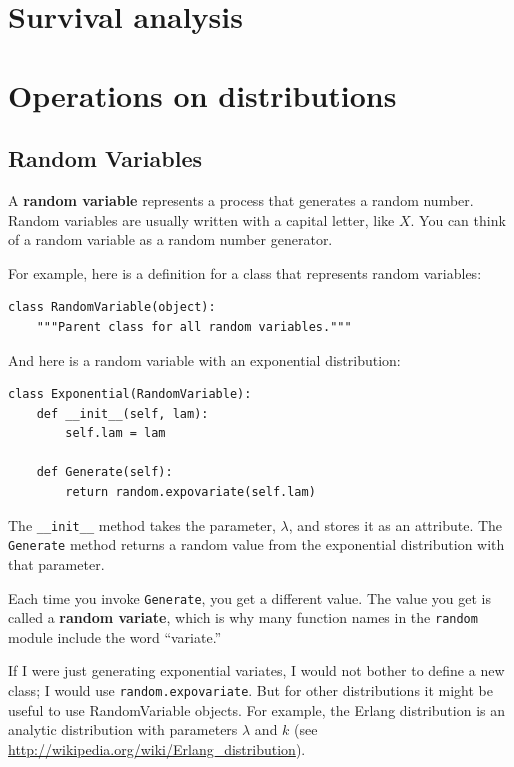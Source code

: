 \documentclass[12pt]{book}
\begin{document}
\chapter{Survival analysis}


\chapter{Operations on distributions}
\label{operations}

\section{Random Variables}

A {\bf random variable} represents a process that generates a random
number.  Random variables are usually written with a capital letter,
like $X$.  You can think of a random variable as a random number
generator.

For example, here is a definition for a class that represents
random variables:
%
\begin{verbatim}
class RandomVariable(object):
    """Parent class for all random variables."""
\end{verbatim}

And here is a random variable with an exponential distribution:
%
\begin{verbatim}
class Exponential(RandomVariable):
    def __init__(self, lam):
        self.lam = lam

    def Generate(self):
        return random.expovariate(self.lam)
\end{verbatim}

The \verb"__init__" method takes the parameter, $\lambda$, and stores
it as an attribute.  The {\tt Generate} method returns a random value
from the exponential distribution with that parameter.   

Each time you invoke {\tt Generate}, you get a different value.  The
value you get is called a {\bf random variate}, which is why many
function names in the {\tt random} module include the word ``variate.''

If I were just generating exponential variates, I would not bother to
define a new class; I would use {\tt random.expovariate}.  But for
other distributions it might be useful to use RandomVariable objects.
For example, the Erlang distribution is an analytic distribution with
parameters $\lambda$ and $k$ (see
\url{http://wikipedia.org/wiki/Erlang_distribution}).
\end{document}
